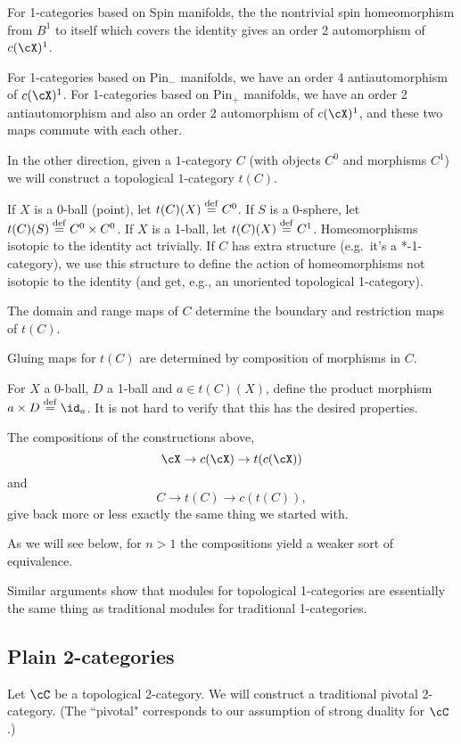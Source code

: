 For 1-categories based on Spin manifolds,
the the nontrivial spin homeomorphism from $B^1$ to itself which covers the identity
gives an order 2 automorphism of $c(\cX)^1$.

For 1-categories based on $\text{Pin}_-$ manifolds,
we have an order 4 antiautomorphism of $c(\cX)^1$.
For 1-categories based on $\text{Pin}_+$ manifolds,
we have an order 2 antiautomorphism and also an order 2 automorphism of $c(\cX)^1$,
and these two maps commute with each other.

\medskip

In the other direction, given a $1$-category $C$
(with objects $C^0$ and morphisms $C^1$) we will construct a topological
$1$-category $t(C)$.

If $X$ is a 0-ball (point), let $t(C)(X) \stackrel{\mathrm{def}}{=} C^0$.
If $S$ is a 0-sphere, let $t(C)(S) \stackrel{\mathrm{def}}{=} C^0\times C^0$.
If $X$ is a 1-ball, let $t(C)(X) \stackrel{\mathrm{def}}{=} C^1$.
Homeomorphisms isotopic to the identity act trivially.
If $C$ has extra structure (e.g.\ it's a *-1-category), we use this structure
to define the action of homeomorphisms not isotopic to the identity
(and get, e.g., an unoriented topological 1-category).

The domain and range maps of $C$ determine the boundary and restriction maps of $t(C)$.

Gluing maps for $t(C)$ are determined by composition of morphisms in $C$.

For $X$ a 0-ball, $D$ a 1-ball and $a\in t(C)(X)$, define the product morphism 
$a\times D \deq \id_a$.
It is not hard to verify that this has the desired properties.

\medskip

The compositions of the constructions above, $$\cX\to c(\cX)\to t(c(\cX))$$ and $$C\to t(C)\to c(t(C)),$$ give back 
more or less exactly the same thing we started with.  

As we will see below, for $n>1$ the compositions yield a weaker sort of equivalence.

\medskip

Similar arguments show that modules for topological 1-categories are essentially
the same thing as traditional modules for traditional 1-categories.

\subsection{Plain 2-categories}
\label{ssec:2-cats}
Let $\cC$ be a topological 2-category.
We will construct a traditional pivotal 2-category.
(The ``pivotal" corresponds to our assumption of strong duality for $\cC$.)

